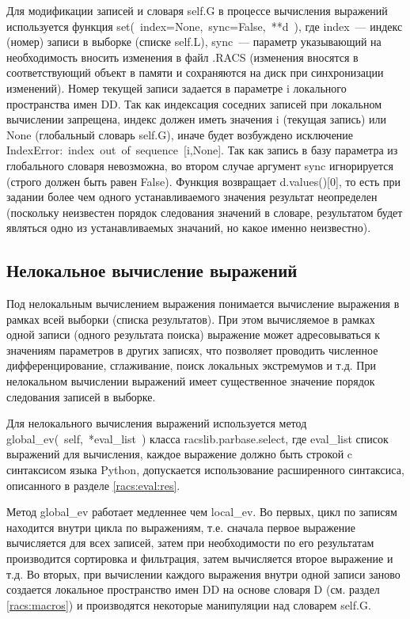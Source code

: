 Для модификации записей и словаря {\sf self.G} в процессе вычисления выражений
используется функция {\sf set(~index=None,~sync=False,~**d~)}, где {\sf index}~--- индекс (номер)
записи в выборке (списке {\sf self.L}), {\sf sync}~---
параметр указывающий на необходимость вносить изменения в файл {\sf .RACS}
(изменения вносятся в соответствующий объект в памяти и сохраняются на диск при
синхронизации изменений). 
Номер текущей записи задается в
параметре {\sf i} локального пространства имен {\sf DD}.
Так как индексация соседних записей при локальном вычислении запрещена, индекс
должен иметь значения {\sf i} (текущая запись) или {\sf None} (глобальный
словарь {\sf self.G}), иначе будет возбуждено исключение 
{\sf IndexError:~index~out~of~sequence~[i,None]}. 
Так как запись в базу параметра из глобального словаря невозможна, во втором случае аргумент {\sf sync} игнорируется (строго должен быть равен {\sf
  False}).%
Функция возвращает {\sf d.values()[0]}, то есть при
задании более чем одного устанавливаемого значения результат неопределен
(поскольку неизвестен порядок следования значений в словаре, результатом будет
являться одно из устанавливаемых значаний, но какое именно неизвестно).

\subsection{Нелокальное вычисление выражений}\label{racs:nolocal:ev}
Под нелокальным вычислением выражения понимается вычисление выражения в рамках
всей выборки (списка результатов). При этом вычисляемое в рамках одной записи
(одного результата поиска) выражение может адресовываться к
значениям параметров в других записях, что позволяет проводить численное
дифференцирование, сглаживание, поиск локальных экстремумов и т.д. При
нелокальном вычислении выражений имеет существенное значение порядок следования
записей в выборке.

Для нелокального вычисления выражений используется метод 
{\sf global\_ev(~self,~*eval\_list~)} 
класса {\sf racslib.parbase.select}, где {\sf eval\_list}
список выражений для вычисления, каждое выражение должно быть строкой c
синтаксисом языка {\sf Python}, допускается использование
расширенного синтаксиса, описанного в разделе \ref{racs:eval:res}.

Метод {\sf global\_ev} работает медленнее чем {\sf local\_ev}. Во первых, цикл
по записям находится внутри цикла по выражениям, т.е. сначала первое
выражение вычисляется для всех записей, затем при необходимости по его результатам
производится сортировка и фильтрация, затем вычисляется второе выражение и
т.д. Во вторых, при вычислении каждого выражения внутри одной записи заново
создается локальное пространство имен {\sf DD} на основе словаря {\sf D}
(см. раздел \ref{racs:macros})  и
производятся  некоторые манипуляции над словарем {\sf self.G}.

